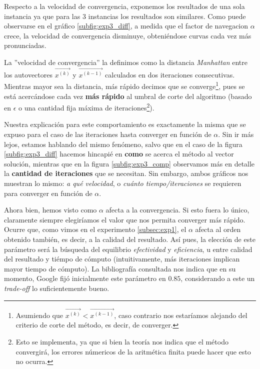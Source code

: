 \par Respecto a la velocidad de convergencia, exponemos los resultados de una
sola instancia ya que para las 3 instancias los resultados son similares. Como
puede observarse en el gráfico \ref{subfig:exp3_diff}, a medida que el factor de
navegacion $\alpha$ crece, la velocidad de convergencia disminuye,
obteni\'endose curvas cada vez m\'as pronunciadas.

\par La ''velocidad de convergencia'' la definimos como la distancia
\emph{Manhattan} entre los autovectores $\vec{x^{(k)}}$ y $\vec{x^{(k-1)}}$
calculados en dos iteraciones consecutivas. Mientras mayor sea la distancia,
m\'as r\'apido decimos que se converge\footnote{Asumiendo que $\vec{x^{(k)}} <
\vec{x^{(k-1)}}$, caso contrario nos estar\'iamos alejando del criterio de corte
del m\'etodo, es decir, de converger.}, pues se est\'a acerc\'andose cada vez
\textbf{m\'as rápido} al umbral de corte del algoritmo (basado en $\epsilon$ o
una cantidad fija m\'axima de iteraciones\footnote{Esto se implementa, ya que si
bien la teor\'ia nos indica que el m\'etodo convergir\'a, los errores
n\'umericos de la aritm\'etica finita puede hacer que esto no ocurra.}).

\par Nuestra explicaci\'on para este comportamiento es exactamente la misma que
se expuso para el caso de las iteraciones hasta converger en funci\'on de
$\alpha$. Sin ir m\'as lejos, estamos hablando del mismo fen\'omeno, salvo que
en el caso de la figura \ref{subfig:exp3_diff} hacemos hincapi\'e en
\textbf{como} se acerca el m\'etodo al vector soluci\'on, mientras que en la figura
\ref{subfig:exp3_comp} observamos m\'as en detalle la \textbf{cantidad de
iteraciones} que se necesitan. Sin embargo, ambos gr\'aficos nos muestran lo
mismo: \textit{a qué velocidad}, o \textit{cuánto tiempo/iteraciones} se
requieren para converger en funci\'on de $\alpha$.

\par Ahora bien, hemos visto como $\alpha$ afecta a la convergencia. Si esto
fuera lo \'unico, claramente siempre elegir\'iamos el valor que nos permita
converger m\'as r\'apido. Ocurre que, como vimos en el experimento
\ref{subsec:exp1}, el $\alpha$ afecta al orden obtenido tambi\'en, es decir, a
la calidad del resultado. As\'i pues, la elecci\'on de este par\'ametro ser\'a
la b\'usqueda del equilibrio \emph{efectividad} y \emph{eficiencia}, u entre
calidad del resultado y ti\'empo de c\'omputo (intuitivamente, m\'as iteraciones
implican mayor tiempo de c\'omputo). La bibliograf\'ia consultada nos indica que
en su momento, Google fij\'o inicialmente este par\'ametro en $0.85$,
considerando a este un \emph{trade-off} lo suficientemente
bueno\cite{Bryan2006}\cite{Langville2006}.

